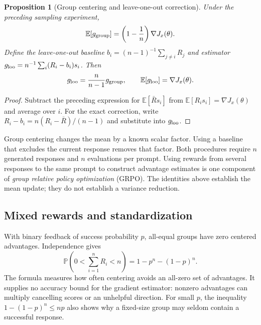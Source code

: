 \documentclass[11pt,twoside]{article}
\newcommand{\E}{\mathbb E}
\renewcommand{\P}{\mathbb P}
\newtheorem{proposition}[theorem]{Proposition}
\theoremstyle{definition}
\theoremstyle{remark}
\begin{document}
\begin{proposition}[Group centering and leave-one-out correction]
\label{prop:group}
Under the preceding sampling experiment,
\begin{equation}
 \E[g_{\rm group}]=\left(1-\frac1n\right)\nabla J_x(\theta).
 \label{eq:group-bias}
\end{equation}
Define the \emph{leave-one-out baseline}
$b_i=(n-1)^{-1}\sum_{j\ne i}R_j$ and estimator
$g_{\rm loo}=n^{-1}\sum_i(R_i-b_i)s_i$. Then
\begin{equation}
 g_{\rm loo}=\frac{n}{n-1}g_{\rm group},\qquad
 \E[g_{\rm loo}]=\nabla J_x(\theta).
 \label{eq:loo}
\end{equation}
\end{proposition}
\begin{proof}
Subtract the preceding expression for $\E[\bar R s_i]$ from
$\E[R_i s_i]=\nabla J_x(\theta)$ and average over $i$.
For the exact correction, write
$R_i-b_i=n(R_i-\bar R)/(n-1)$ and substitute into $g_{\rm loo}$.
\end{proof}

Group centering changes the mean by a known scalar factor. Using a baseline
that excludes the current response removes that factor. Both procedures
require $n$ generated responses and $n$ evaluations per prompt.
Using rewards from several responses to the same prompt to construct
advantage estimates is one component of
\emph{group relative policy optimization} (GRPO).\label{en:group-relative}
The identities above establish the mean update; they do not establish
a variance reduction.

\subsection{Mixed rewards and standardization}

With binary feedback of success probability $p$, all-equal groups have zero
centered advantages. Independence gives
\begin{equation}
 \P\!\left(0<\sum_{i=1}^n R_i<n\right)=1-p^n-(1-p)^n.
 \label{eq:mixed-group}
\end{equation}
The formula measures how often centering avoids an all-zero set of
advantages. It supplies no accuracy bound for the gradient estimator:
nonzero advantages can multiply cancelling scores or an unhelpful direction.
For small $p$, the inequality $1-(1-p)^n\le np$ also shows why a fixed-size
group may seldom contain a successful response.
\end{document}
